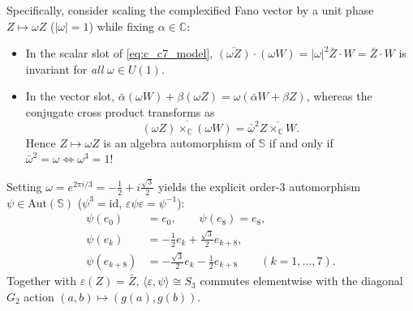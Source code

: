 \documentclass[journal,twoside]{IEEEtran}
\theoremstyle{definition}
\theoremstyle{remark}
\newcommand{\C}{\mathbb{C}}
\newcommand{\Se}{\mathbb{S}}
\newcommand{\Aut}{\mathrm{Aut}}
\begin{document}
Specifically, consider scaling the complexified Fano vector by a unit phase $Z \mapsto \omega Z$ ($|\omega| = 1$) while fixing $\alpha \in \C$:
\begin{itemize}
    \item In the scalar slot of \eqref{eq:c_c7_model}, $\overline{(\omega Z)}\cdot(\omega W) = |\omega|^2 \bar{Z}\cdot W = \bar{Z}\cdot W$ is invariant for \emph{all} $\omega \in U(1)$.
    \item In the vector slot, $\bar{\alpha}(\omega W) + \beta(\omega Z) = \omega(\bar{\alpha}W + \beta Z)$, whereas the conjugate cross product transforms as
    \begin{equation}
        \overline{(\omega Z) \times_{\C} (\omega W)} = \bar{\omega}^2 \overline{Z \times_{\C} W}.
    \end{equation}
    Hence $Z \mapsto \omega Z$ is an algebra automorphism of $\Se$ if and only if $\bar{\omega}^2 = \omega \iff \omega^3 = 1$!
\end{itemize}
Setting $\omega = e^{2\pi i/3} = -\frac{1}{2} + i\frac{\sqrt{3}}{2}$ yields the explicit order-3 automorphism $\psi \in \Aut(\Se)$ ($\psi^3 = \mathrm{id}$, $\varepsilon\psi\varepsilon = \psi^{-1}$):
\begin{equation}
\begin{aligned}
    \psi(e_0) &= e_0, \qquad \psi(e_8) = e_8, \\
    \psi(e_k) &= -\frac{1}{2}e_k + \frac{\sqrt{3}}{2}e_{k+8}, \\
    \psi(e_{k+8}) &= -\frac{\sqrt{3}}{2}e_k - \frac{1}{2}e_{k+8} \qquad (k = 1,\dots,7).
\end{aligned}
\label{eq:psi_s3}
\end{equation}
Together with $\varepsilon(Z) = \bar{Z}$, $\langle \varepsilon, \psi\rangle \cong S_3$ commutes elementwise with the diagonal $G_2$ action $(a,b) \mapsto (g(a), g(b))$.
\end{document}
